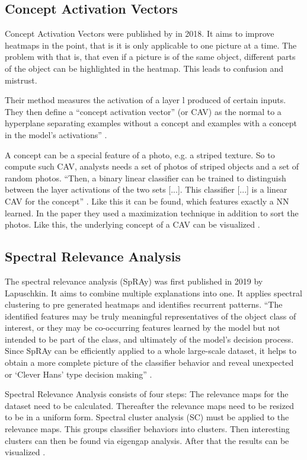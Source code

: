 \subsection{Concept Activation Vectors}
Concept Activation Vectors were published by  in 2018. It aims to improve heatmaps in the point, that is it is only applicable to one picture at a time. The problem with that is, that even if a picture is of the same object, different parts of the object can be highlighted in the heatmap. This leads to confusion and mistrust.
\par
Their method measures the activation of a layer l produced of certain inputs. They then define a “concept activation vector” (or CAV) as the normal to a hyperplane separating examples without a concept and examples with a concept in the model’s activations” \cite[3]{Kim.2018}.
\par
A concept can be a special feature of a photo, e.g. a striped texture. So to compute such CAV, analysts needs a set of photos of striped objects and a set of random photos.
“Then, a binary linear classifier can be trained to distinguish between the layer activations of the two sets 
[...].
This classifier 
[...]
is a linear CAV for the concept” \cite[3]{Kim.2018}. Like this it can be found, which features exactly a NN learned.
In the paper they used a maximization technique in addition to sort the photos. Like this, the  underlying concept of a CAV can be visualized \cite{Kim.2018}.

\subsection{Spectral Relevance Analysis}
The spectral relevance analysis (SpRAy)  was first published in 2019 by Lapuschkin. It aims to combine multiple explanations into one. It applies spectral clustering to pre generated heatmaps and identifies recurrent patterns. “The identified features may be truly meaningful representatives of the object class of interest, or they may be co-occurring features learned by the model but not intended to be part of the class, and ultimately of the model’s decision process. Since SpRAy can be efficiently applied to a whole large-scale dataset, it helps to obtain a more complete picture of the classifier behavior and reveal unexpected or ‘Clever Hans’ type decision making” \cite[8]{Lapuschkin.2019}.
\par
Spectral Relevance Analysis consists of four steps:
The relevance maps for the dataset need to be calculated.
Thereafter the relevance maps need to be resized to be in a uniform form.
Spectral cluster analysis (SC) must be applied to the relevance maps. This groups classifier behaviors into clusters.
Then interesting clusters can then be found via eigengap analysis.
After that the results can be visualized \cite{Lapuschkin.2019}.
